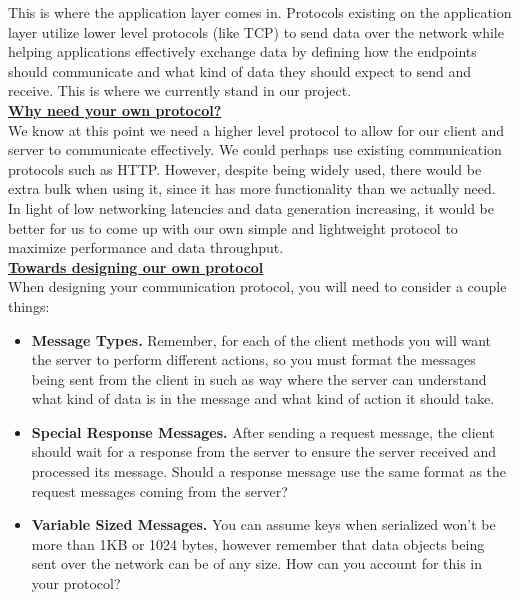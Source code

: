 \documentclass{article}
\begin{document}
This is where the application layer comes in. Protocols existing on the application layer utilize lower level protocols (like TCP) to send data over the network while helping applications effectively exchange data by defining how the endpoints should communicate and what kind of data they should expect to send and receive. This is where we currently stand in our project. \\

\noindent \underline{\textbf{Why need your own protocol?}} \vspace{0.2cm} \\
We know at this point we need a higher level protocol to allow for our client and server to communicate effectively. We could perhaps use existing communication protocols such as HTTP. However, despite being widely used, there would be extra bulk when using it, since it has more functionality than we actually need. In light of low networking latencies and data generation increasing, it would be better for us to come up with our own simple and lightweight protocol to maximize performance and data throughput.\\ 

\noindent \underline{\textbf{Towards designing our own protocol}} \vspace{0.2cm} \\
\noindent When designing your communication protocol, you will need to consider a couple things:
\begin{itemize}
    \item \textbf{Message Types.} Remember, for each of the client methods you will want the server to perform different actions, so you must format the messages being sent from the client in such as way where the server can understand what kind of data is in the message and what kind of action it should take.
    \item \textbf{Special Response Messages.} After sending a request message, the client should wait for a response from the server to ensure the server received and processed its message. Should a response message use the same format as the request messages coming from the server?
    \item \textbf{Variable Sized Messages.} You can assume keys when serialized won't be more than 1KB or 1024 bytes, however remember that data objects being sent over the network can be of any size. How can you account for this in your protocol?
\end{itemize}

\end{document}
